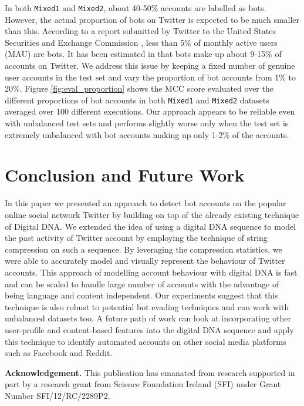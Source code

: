 \documentclass{llncs}
\begin{document}
In both \texttt{Mixed1} and \texttt{Mixed2}, about 40-50\% accounts are labelled as bots. However, the actual proportion of bots on Twitter is expected to be much smaller than this. According to a report submitted by Twitter to the United States Securities and Exchange Commission \cite{twitter_sec_2014}, less than 5\% of monthly active users (MAU) are bots. It has been estimated in \cite{varol2017online} that bots make up about 9-15\% of accounts on Twitter. We address this issue by keeping a fixed number of genuine user accounts in the test set and vary the proportion of bot accounts from 1\% to 20\%. Figure \ref{fig:eval_proportion} shows the MCC score evaluated over the different proportions of bot accounts in both \texttt{Mixed1} and \texttt{Mixed2} datasets averaged over 100 different executions. Our approach appears to be reliable even with unbalanced test sets and performs slightly worse only when the test set is extremely unbalanced with bot accounts making up only 1-2\% of the accounts.

\section{Conclusion and Future Work}
In this paper we presented an approach to detect bot accounts on the popular online social network Twitter by building on top of the already existing technique of Digital DNA. We extended the idea of using a digital DNA sequence to model the past activity of Twitter account by employing the technique of string compression on such a sequence. By leveraging the compression statistics, we were able to accurately model and visually represent the behaviour of Twitter accounts. This approach of modelling account behaviour with digital DNA is fast and can be scaled to handle large number of accounts with the advantage of being language and content independent. Our experiments suggest that this technique is also robust to potential bot evading techniques and can work with unbalanced datasets too. A future path of work can look at incorporating other user-profile and content-based features into the digital DNA sequence and apply this technique to identify automated accounts on other social media platforms such as Facebook and Reddit.

\vspace{3mm}
\noindent\textbf{Acknowledgement.} This publication has emanated from research supported in part by a research grant from Science Foundation Ireland (SFI) under Grant Number SFI/12/RC/2289P2.


 
\end{document}
